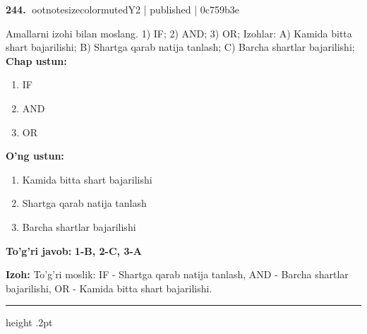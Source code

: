 \documentclass[10pt,a4paper]{article}
\begin{document}
\textbf{\color{ink}244.} {ootnotesizecolor{muted}Y2 | published | 0c759b3e}
\par
Amallarni izohi bilan moslang.  1) IF;  2) AND;  3) OR;  Izohlar: A) Kamida bitta shart bajarilishi;  B) Shartga qarab natija tanlash;  C) Barcha shartlar bajarilishi;
\textbf{Chap ustun:}\begin{enumerate}[label=\arabic*),leftmargin=9mm]
\item IF
\item AND
\item OR
\end{enumerate}
\textbf{O'ng ustun:}\begin{enumerate}[label=\Alph*),leftmargin=9mm]
\item Kamida bitta shart bajarilishi
\item Shartga qarab natija tanlash
\item Barcha shartlar bajarilishi
\end{enumerate}
\begin{tcolorbox}[enhanced,breakable,colback=teal!4,colframe=teal!55!black,boxrule=0.45pt,arc=1.2mm,left=2.8mm,right=2.8mm,top=2mm,bottom=2mm]
\textbf{\color{teal}To'g'ri javob:} \textbf{1-B, 2-C, 3-A}
\par\smallskip
\textbf{Izoh:} To'g'ri moslik: IF - Shartga qarab natija tanlash, AND - Barcha shartlar bajarilishi, OR - Kamida bitta shart bajarilishi.
\end{tcolorbox}
\vspace{2mm}\hrule height .2pt\vspace{2mm}
\end{document}
